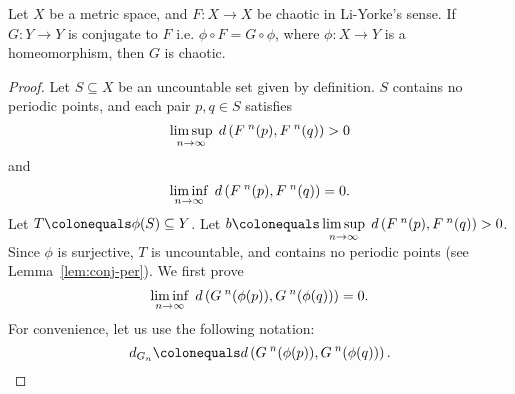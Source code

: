 \documentclass[10pt,draft,twoside]{book}
\begin{document}
\begin{theorem}
  Let $X$ be a metric space, and $F: X\to X$ be chaotic in Li-Yorke's sense.
  If $G: Y\to Y$ is conjugate to $F$ i.e. $\phi \circ F = G \circ \phi$, where $\phi: X \to Y$ is a homeomorphism, then $G$ is chaotic.
  \begin{proof}
    Let $S \subseteq X$ be an uncountable set given by definition.
    $S$ contains no periodic points, and each pair $p,q \in S$ satisfies
    \begin{equation*}
      \limsup\limits_{n \to \infty}\; d\left( F^{\;n}(p) , F^{\;n}(q) \right) > 0
    \end{equation*}
    and
    \begin{equation*}
      \liminf\limits_{n \to \infty}\; d\left( F^{\;n}(p) , F^{\;n}(q) \right) = 0.
    \end{equation*}
    Let $T \ceq \phi(S) \subseteq Y$.
    Let $b \ceq \limsup\limits_{n \to \infty}\; \metric{\itr{F}{n}(p) , \itr{F}{n}(q)} > 0$.
    Since $\phi$ is surjective, $T$ is uncountable, and contains no periodic points (see Lemma~\ref{lem:conj-per}).
    We first prove
    \begin{equation*}
      \liminf\limits_{n \to \infty}\; d\left( G^{\;n}(\phi(p)) , G^{\;n}(\phi(q)) \right) = 0.
    \end{equation*}
    For convenience, let us use the following notation:
    \begin{equation*}
      d_{G_n} \ceq \metric{\itr{G}{n}(\phi(p)) , \itr{G}{n}(\phi(q))}.
    \end{equation*}


\end{proof}
\end{theorem}
\end{document}
